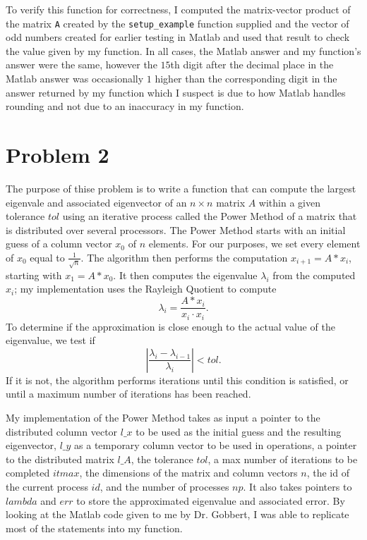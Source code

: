 \documentclass[11pt]{article}
\begin{document}
To verify this function for correctness, I computed the matrix-vector product of the matrix \texttt{A} created by the \texttt{setup\_example} function supplied and the vector of odd numbers created for earlier testing in Matlab and used that result to check the value given by my function. In all cases, the Matlab answer and my function's answer were the same, however the $15$th digit after the decimal place in the Matlab answer was occasionally $1$ higher than the corresponding digit in the answer returned by my function which I suspect is due to how Matlab handles rounding and not due to an inaccuracy in my function.
\pagebreak
\section{Problem 2}
The purpose of thise problem is to write a function that can compute the largest eigenvale and associated eigenvector of an $n \times n$ matrix $A$ within a given tolerance $tol$ using an iterative process called the Power Method of a matrix that is distributed over several processors. The Power Method starts with an initial guess of a column vector $x_{0}$ of $n$ elements. For our purposes, we set every element of $x_{0}$ equal to $\frac{1}{\sqrt{n}}$. The algorithm then performs the computation $x_{i+1}=A*x_{i}$, starting with $x_{1}=A*x_{0}$. It then computes the eigenvalue $\lambda_{i}$ from the computed $x_{i}$; my implementation uses the Rayleigh Quotient to compute 
$$\lambda_{i}=\frac{A*x_{i}}{x_{i}\cdot x_{i}}.$$
To determine if the approximation is close enough to the actual value of the eigenvalue, we test if 
$$\left|\frac{\lambda_{i}-\lambda_{i-1}}{\lambda_{i}}\right| < tol.$$ 
If it is not, the algorithm performs iterations until this condition is satisfied, or until a maximum number of iterations has been reached.

My implementation of the Power Method takes as input a pointer to the distributed column vector $l\_x$ to be used as the initial guess and the resulting eigenvector, $l\_y$ as a temporary column vector to be used in operations, a pointer to the distributed matrix $l\_A$, the tolerance $tol$, a max number of iterations to be completed $itmax$, the dimensions of the matrix and column vectors $n$, the id of the current process $id$, and the number of processes $np$. It also takes pointers to $lambda$ and $err$ to store the approximated eigenvalue and associated error. By looking at the Matlab code given to me by Dr. Gobbert, I was able to replicate most of the statements into my function.
\end{document}
